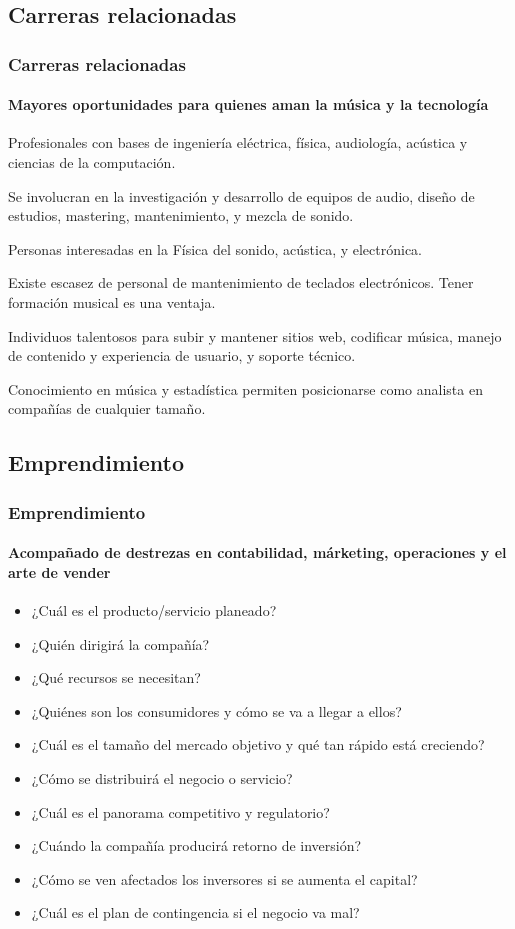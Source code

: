 \documentclass[xcolor=table]{beamer}
\begin{document}
	\subsection{Carreras relacionadas}
	\begin{frame}[allowframebreaks]
    		\frametitle{Carreras relacionadas}
		\framesubtitle{Mayores oportunidades para quienes aman la música y la tecnología}
		\begin{tcolorbox}[colback=white,colframe=udlacolour,title=Ingenierio de audio]
    			Profesionales con bases de ingeniería eléctrica, física, audiología, acústica y ciencias de la computación.
    		\end{tcolorbox}
		
		Se involucran en la investigación y desarrollo de equipos de audio, diseño de estudios, mastering, mantenimiento, y mezcla de sonido.
		\begin{tcolorbox}[colback=white,colframe=udlacolour,title=Inventores/Reparadores de instrumentos]
    			Personas interesadas en la Física del sonido, acústica, y electrónica.
    		\end{tcolorbox} 
		Existe escasez de personal de mantenimiento de teclados electrónicos. Tener formación musical es una ventaja.
		
		\begin{tcolorbox}[colback=white,colframe=udlacolour,title=Desarrolladores de música en línea]
    			Individuos talentosos para subir y mantener sitios web, codificar música, manejo de contenido y experiencia de usuario, y soporte técnico.
    		\end{tcolorbox}
		Conocimiento en música y estadística permiten posicionarse como analista en compañías de cualquier tamaño.
	\end{frame}
	\subsection{Emprendimiento}
	\begin{frame}[allowframebreaks]
		\frametitle{Emprendimiento}
		\framesubtitle{Acompañado de destrezas en contabilidad, márketing, operaciones y el arte de vender}
		\begin{itemize}
			\item ¿Cuál es el producto/servicio planeado?
			\item ¿Quién dirigirá la compañía?
			\item ¿Qué recursos se necesitan?
			\item ¿Quiénes son los consumidores y cómo se va a llegar a ellos?
			\item ¿Cuál es el tamaño del mercado objetivo y qué tan rápido está creciendo?
			\item ¿Cómo se distribuirá el negocio o servicio?
			\item ¿Cuál es el panorama competitivo y regulatorio?
			\item ¿Cuándo la compañía producirá retorno de inversión?
			\item ¿Cómo se ven afectados los inversores si se aumenta el capital?
			\item ¿Cuál es el plan de contingencia si el negocio va mal?
		\end{itemize}
	\end{frame}
\end{document}
